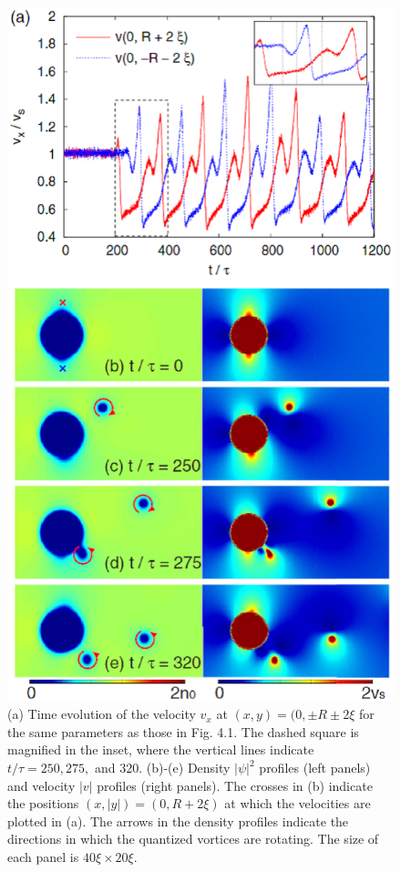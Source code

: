 \documentclass[12pt,a4paper]{report}
\begin{document}
\begin{figure}[htbp]
\begin{center}
\includegraphics[scale=0.53, keepaspectratio]{4-2.eps}
\caption{
(a) Time evolution of the velocity $v_x$ at
$(x,y)=(0, \pm R \pm 2 \xi$ for the same parameters as those in Fig. 4.1.
The dashed square is magnified in the inset, where the vertical lines
indicate $t/\tau = 250,275,$ and $320$. (b)-(e) Density $|\psi|^2$ profiles (left
panels) and velocity $|v|$ profiles (right panels). The crosses in (b)
indicate the positions $(x,|y|)=(0,R+2 \xi)$ at which the velocities
are plotted in (a). The arrows in the density profiles indicate the
directions in which the quantized vortices are rotating. The size of
each panel is $40 \xi \times 20 \xi$.
}
\label{FIG:4-2}
\end{center}
\end{figure}
\end{document}
